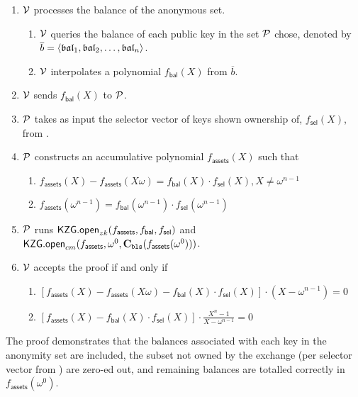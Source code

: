 

\begin{Protocol*}[t!]
\begin{mdframed}
\footnotesize


\begin{enumerate}
	\item $\mathcal{V}$ processes the balance of the anonymous set.
	\begin{enumerate}
		\item $\mathcal{V}$ queries the balance of each public key in the set $\mathcal{P}$ chose, denoted by $\overline{b}=\left \langle \mathfrak{bal}_1,\mathfrak{bal}_2,\dots,\mathfrak{bal}_n \right \rangle$.
		\item $\mathcal{V}$ interpolates a polynomial $f_\mathsf{bal}(X)$ from $\overline{b}$.
	\end{enumerate}
	\item $\mathcal{V}$ sends $f_\mathsf{bal}(X)$ to $\mathcal{P}$.
	\item $\mathcal{P}$ takes as input the selector vector of keys shown ownership of, $f_\mathsf{sel}(X)$, from \bootstrap.
	\item $\mathcal{P}$ constructs an accumulative polynomial $f_\mathsf{assets}(X)$ such that
		\begin{enumerate}
	\item $f_\mathsf{assets}(X)-f_\mathsf{assets}(X\omega)=f_\mathsf{bal}(X)\cdot{f_\mathsf{sel}(X)},X\ne{\omega^{n-1}}$
	\item $f_\mathsf{assets}(\omega^{n-1})=f_\mathsf{bal}(\omega^{n-1})\cdot{f_\mathsf{sel}}(\omega^{n-1})$
		\end{enumerate}
	\item $\mathcal{P}$ runs $\mathsf{KZG.open}_{zk}(f_\mathsf{assets},f_\mathsf{bal},f_\mathsf{sel})$ and $\mathsf{KZG.open}_{cm}(f_\mathsf{assets},\omega^0,\textbf{C}_\texttt{bls}(f_\mathsf{assets}(\omega^0)))$.
	\item $\mathcal{V}$ accepts the proof if and only if
	\begin{enumerate}
		\item $[f_\mathsf{assets}(X)-f_\mathsf{assets}(X\omega)-f_\mathsf{bal}(X)\cdot{f_\mathsf{sel}(X)}]\cdot(X-\omega^{n-1})=0$
		\item $[f_\mathsf{assets}(X)-f_\mathsf{bal}(X)\cdot{f_\mathsf{sel}(X)}]\cdot\frac{X^n-1}{X-\omega^{n-1}}=0$
	\end{enumerate}
\end{enumerate}	


\normalsize	
\end{mdframed}
\caption{The \poa proof demonstrates that the balances associated with each key in the anonymity set are included, the subset not owned by the exchange (per selector vector from \bootstrap) are zero-ed out, and remaining balances are totalled correctly in $f_\mathsf{assets}(\omega^0)$. \label{alg:poa}}
\end{Protocol*}

